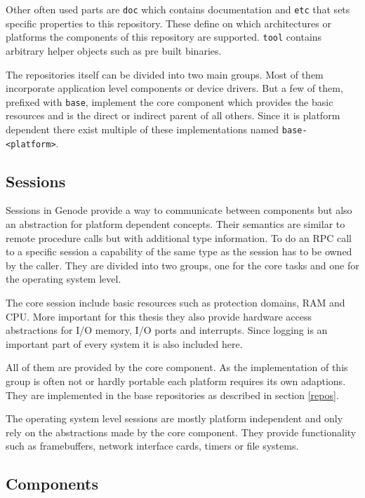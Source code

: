 \documentclass[
a4paper,
12pt,
notitlepage,
parskip=half,
DIV=11,
]{scrbook}
\begin{document}
		Other often used parts are \texttt{doc} which contains documentation and \texttt{etc} that sets specific properties to this repository.
		These define on which architectures or platforms the components of this repository are supported.
		\texttt{tool} contains arbitrary helper objects such as pre built binaries.
		
		The repositories itself can be divided into two main groups.
		Most of them incorporate application level components or device drivers.
		But a few of them, prefixed with \texttt{base}, implement the core component which provides the basic resources and is the direct or indirect parent of all others.
		Since it is platform dependent there exist multiple of these implementations named \texttt{base-<platform>}. \citep{genode}
		
		\subsection{Sessions}
		\label{sessions}
		
		Sessions in Genode provide a way to communicate between components but also an abstraction for platform dependent concepts.
		Their semantics are similar to remote procedure calls but with additional type information.
		To do an RPC call to a specific session a capability of the same type as the session has to be owned by the caller.
		They are divided into two groups, one for the core tasks and one for the operating system level.
		
		The core session include basic resources such as protection domains, RAM and CPU.
		More important for this thesis they also provide hardware access abstractions for I/O memory, I/O ports and interrupts.
		Since logging is an important part of every system it is also included here.
		
		All of them are provided by the core component.
		As the implementation of this group is often not or hardly portable each platform requires its own adaptions.
		They are implemented in the base repositories as described in section \ref{repos}.
		
		The operating system level sessions are mostly platform independent and only rely on the abstractions made by the core component.
		They provide functionality such as framebuffers, network interface cards, timers or file systems. \citep{genode}
		
		\subsection{Components}
		
\end{document}
